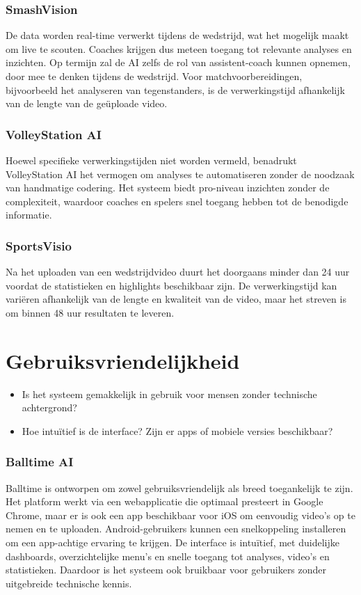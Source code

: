 \subsubsection{SmashVision}
De data worden real-time verwerkt tijdens de wedstrijd, wat het mogelijk maakt om live te scouten. Coaches krijgen dus meteen toegang tot relevante analyses en inzichten. Op termijn zal de AI zelfs de rol van assistent-coach kunnen opnemen, door mee te denken tijdens de wedstrijd. Voor matchvoorbereidingen, bijvoorbeeld het analyseren van tegenstanders, is de verwerkingstijd afhankelijk van de lengte van de geüploade video.
\subsubsection{VolleyStation AI}
Hoewel specifieke verwerkingstijden niet worden vermeld, benadrukt VolleyStation AI het vermogen om analyses te automatiseren zonder de noodzaak van handmatige codering. Het systeem biedt pro-niveau inzichten zonder de complexiteit, waardoor coaches en spelers snel toegang hebben tot de benodigde informatie. 
\subsubsection{SportsVisio}
Na het uploaden van een wedstrijdvideo duurt het doorgaans minder dan 24 uur voordat de statistieken en highlights beschikbaar zijn. De verwerkingstijd kan variëren afhankelijk van de lengte en kwaliteit van de video, maar het streven is om binnen 48 uur resultaten te leveren.

\section{Gebruiksvriendelijkheid}
\begin{itemize}
  \item Is het systeem gemakkelijk in gebruik voor mensen zonder technische achtergrond?
  \item Hoe intuïtief is de interface? Zijn er apps of mobiele versies beschikbaar?
\end{itemize}
\subsubsection{Balltime AI}
Balltime is ontworpen om zowel gebruiksvriendelijk als breed toegankelijk te zijn. Het platform werkt via een webapplicatie die optimaal presteert in Google Chrome, maar er is ook een app beschikbaar voor iOS om eenvoudig video's op te nemen en te uploaden. Android-gebruikers kunnen een snelkoppeling installeren om een app-achtige ervaring te krijgen. De interface is intuïtief, met duidelijke dashboards, overzichtelijke menu’s en snelle toegang tot analyses, video’s en statistieken. Daardoor is het systeem ook bruikbaar voor gebruikers zonder uitgebreide technische kennis.
